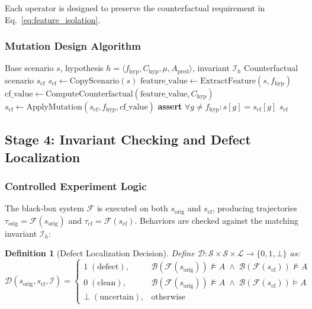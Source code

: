 \documentclass[conference]{IEEEtran}
\theoremstyle{plain}
\newtheorem{definition}{Definition}[section]
\newcommand{\invlib}{\mathcal{L}}
\newcommand{\scenario}{\mathcal{S}}
\newcommand{\sys}{\mathcal{F}}
\newcommand{\beh}{\mathcal{B}}
\newcommand{\diag}{\mathcal{D}}
\begin{document}
Each operator is designed to preserve the counterfactual requirement in Eq.~\ref{eq:feature_isolation}.

\subsubsection{Mutation Design Algorithm}

\begin{algorithm}[h]
\caption{Counterfactual Mutation Design}
\label{alg:mutation}
\begin{algorithmic}[1]
\Require Base scenario $s$, hypothesis $h = \langle f_{\text{hyp}}, C_{\text{hyp}}, \mu, A_{\text{pred}} \rangle$, invariant $\mathcal{I}_h$
\Ensure Counterfactual scenario $s_{\text{cf}}$
\State $s_{\text{cf}} \gets \text{CopyScenario}(s)$
\State $\text{feature\_value} \gets \text{ExtractFeature}(s, f_{\text{hyp}})$
\State $\text{cf\_value} \gets \text{ComputeCounterfactual}(\text{feature\_value}, C_{\text{hyp}})$
\State $s_{\text{cf}} \gets \text{ApplyMutation}(s_{\text{cf}}, f_{\text{hyp}}, \text{cf\_value})$
\State \textbf{assert} $\forall g \neq f_{\text{hyp}}: s[g] = s_{\text{cf}}[g]$  
\State \Return $s_{\text{cf}}$
\end{algorithmic}
\end{algorithm}

\subsection{Stage 4: Invariant Checking and Defect Localization}

\subsubsection{Controlled Experiment Logic}

The black-box system $\sys$ is executed on both $s_{\text{orig}}$ and $s_{\text{cf}}$, producing trajectories $\tau_{\text{orig}} = \sys(s_{\text{orig}})$ and $\tau_{\text{cf}} = \sys(s_{\text{cf}})$. Behaviors are checked against the matching invariant $\mathcal{I}_h$:

\begin{definition}[Defect Localization Decision]\label{def:diagnosis}
Define $\diag: \scenario \times \scenario \times \invlib \rightarrow \{0, 1, \bot\}$ as:
\begin{equation}
\diag(s_{\text{orig}}, s_{\text{cf}}, \mathcal{I}) = 
\begin{cases}
1 \; (\text{defect}), & \beh(\sys(s_{\text{orig}})) \not\models A \;\land\; \beh(\sys(s_{\text{cf}})) \not\models A \\[4pt]
0 \; (\text{clean}), & \beh(\sys(s_{\text{orig}})) \not\models A \;\land\; \beh(\sys(s_{\text{cf}})) \models A \\[4pt]
\bot \; (\text{uncertain}), & \text{otherwise}
\end{cases}
\label{eq:diagnosis}
\end{equation}
\end{definition}
\end{document}
